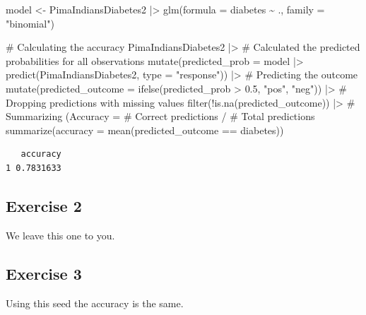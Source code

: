 \documentclass[
  letterpaper,
  DIV=11,
  numbers=noendperiod]{scrreprt}
\newenvironment{Shaded}{\begin{snugshade}}{\end{snugshade}}
\newcommand{\AttributeTok}[1]{\textcolor[rgb]{0.40,0.45,0.13}{#1}}
\newcommand{\CommentTok}[1]{\textcolor[rgb]{0.37,0.37,0.37}{#1}}
\newcommand{\FloatTok}[1]{\textcolor[rgb]{0.68,0.00,0.00}{#1}}
\newcommand{\FunctionTok}[1]{\textcolor[rgb]{0.28,0.35,0.67}{#1}}
\newcommand{\NormalTok}[1]{\textcolor[rgb]{0.00,0.23,0.31}{#1}}
\newcommand{\OtherTok}[1]{\textcolor[rgb]{0.00,0.23,0.31}{#1}}
\newcommand{\SpecialCharTok}[1]{\textcolor[rgb]{0.37,0.37,0.37}{#1}}
\newcommand{\StringTok}[1]{\textcolor[rgb]{0.13,0.47,0.30}{#1}}
\begin{document}
\begin{Shaded}
\begin{Highlighting}[]
\NormalTok{model }\OtherTok{\textless{}{-}}\NormalTok{ PimaIndiansDiabetes2 }\SpecialCharTok{|\textgreater{}} 
  \FunctionTok{glm}\NormalTok{(}\AttributeTok{formula =}\NormalTok{ diabetes }\SpecialCharTok{\textasciitilde{}}\NormalTok{ ., }\AttributeTok{family =} \StringTok{"binomial"}\NormalTok{)}

\CommentTok{\# Calculating the accuracy}
\NormalTok{PimaIndiansDiabetes2 }\SpecialCharTok{|\textgreater{}} 
  \CommentTok{\# Calculated the predicted probabilities for all observations}
  \FunctionTok{mutate}\NormalTok{(}\AttributeTok{predicted\_prob =}\NormalTok{ model }\SpecialCharTok{|\textgreater{}} \FunctionTok{predict}\NormalTok{(PimaIndiansDiabetes2, }\AttributeTok{type =} \StringTok{"response"}\NormalTok{)) }\SpecialCharTok{|\textgreater{}} 
  \CommentTok{\# Predicting the outcome}
  \FunctionTok{mutate}\NormalTok{(}\AttributeTok{predicted\_outcome =} \FunctionTok{ifelse}\NormalTok{(predicted\_prob }\SpecialCharTok{\textgreater{}} \FloatTok{0.5}\NormalTok{, }\StringTok{"pos"}\NormalTok{, }\StringTok{"neg"}\NormalTok{)) }\SpecialCharTok{|\textgreater{}} 
  \CommentTok{\# Dropping predictions with missing values}
  \FunctionTok{filter}\NormalTok{(}\SpecialCharTok{!}\FunctionTok{is.na}\NormalTok{(predicted\_outcome)) }\SpecialCharTok{|\textgreater{}}
  \CommentTok{\# Summarizing (Accuracy = \# Correct predictions / \# Total predictions}
  \FunctionTok{summarize}\NormalTok{(}\AttributeTok{accuracy =} \FunctionTok{mean}\NormalTok{(predicted\_outcome }\SpecialCharTok{==}\NormalTok{ diabetes))}
\end{Highlighting}
\end{Shaded}

\begin{verbatim}
   accuracy
1 0.7831633
\end{verbatim}

\subsection{Exercise 2}\label{exercise-2-33}

We leave this one to you.

\subsection{Exercise 3}\label{exercise-3-23}

Using this seed the accuracy is the same.
\end{document}
